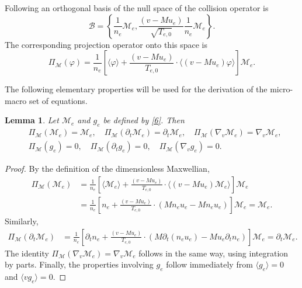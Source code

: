 \documentclass[pdflatex,final,10pt]{article}
\newtheorem{lemma}{Lemma}[section]
\newcommand{\Fabrice}[1]{#1}
\newcommand{\Del}[1]{#1}
\begin{document}
Following \cite{bennoune2008uniformly} an orthogonal basis of the \Fabrice{null space of the collision operator} is
\begin{equation} \label{9}
    \mathcal B=\left\{ \frac{1}{n_e}\mathcal{M}_{e}, \frac{(v-Mu_e)}{\sqrt{T_{e,0}}}\frac{1}{n_e}\mathcal{M}_{e} \right\}.
\end{equation}
The corresponding projection operator onto this space is
\begin{equation} \label{10}
    \Pi_{\mathcal{M}}(\varphi)=\frac{1}{n_e}\left[ \langle\varphi\rangle+\frac{(v-Mu_e)}{T_{e,0}}\cdot\langle(v-Mu_e)\varphi\rangle \right]\mathcal{M}_{e}.
\end{equation}

The following elementary properties will be used \Fabrice{for the derivation of the micro-macro set of equations.}
\begin{lemma}
Let $\mathcal{M}_e$ and $g_e$ be defined by \eqref{6}. Then
\begin{align*}
        &\Pi_{\mathcal{M}}(\mathcal{M}_{e})=\mathcal{M}_{e}, \quad \Pi_{\mathcal{M}}(\partial_t\mathcal{M}_{e})=\partial_t\mathcal{M}_{e},\quad \Pi_{\mathcal{M}}(\nabla_v\mathcal{M}_{e})=\nabla_v\mathcal{M}_{e},\\
        &\Pi_{\mathcal{M}}(g_e)=0, \quad \Pi_{\mathcal{M}}(\partial_tg_e)=0,\quad \Pi_{\mathcal{M}}(\nabla_v g_e)=0.
\end{align*}
\end{lemma}

\begin{proof}
By the definition of the dimensionless Maxwellian,
\begin{align*}
        \Pi_{\mathcal{M}}(\mathcal{M}_{e}) &= \frac{1}{n_e}\left[ \langle\mathcal{M}_{e}\rangle+\frac{(v-Mu_e)}{T_{e,0}}\cdot\langle(v-Mu_e)\mathcal{M}_{e}\rangle \right]\mathcal{M}_{e}\\
        &=\frac{1}{n_e}\left[ n_e +\frac{(v-Mu_e)}{T_{e,0}}\cdot(Mn_eu_e-Mn_eu_e) \right]\mathcal{M}_{e}=\mathcal{M}_e.
\end{align*}
Similarly,
\Del{\begin{align*}
        \Pi_{\mathcal{M}}(\partial_t\mathcal{M}_{e}) &= \frac{1}{n_e}\left[ \partial_tn_e+\frac{(v-Mu_e)}{T_{e,0}}\cdot(M\partial_t(n_eu_e) - Mu_e\partial_tn_e) \right]\mathcal{M}_{e} %
        =\partial_t\mathcal{M}_e.
\end{align*}}
The identity $\Pi_{\mathcal{M}}(\nabla_v\mathcal{M}_e)=\nabla_v\mathcal{M}_e$ follows in the same way, using integration by parts. Finally, the properties involving $g_e$ follow immediately from $\langle g_e\rangle=0$ and $\langle vg_e\rangle=0$.
\end{proof}
\end{document}
